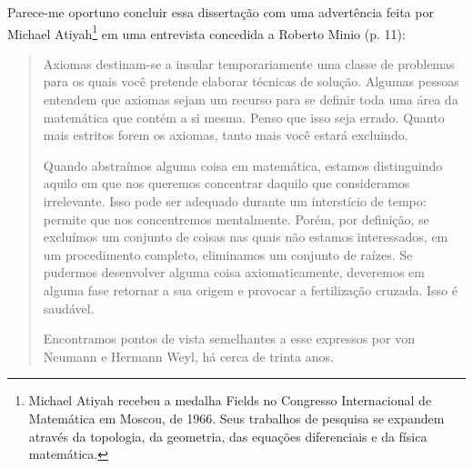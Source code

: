 \documentclass{hipatia}
\begin{document}
Parece-me oportuno concluir essa dissertação com uma advertência feita por Michael Atiyah\footnote{Michael Atiyah recebeu a medalha Fields no Congresso Internacional de Matemática em Moscou, de 1966. Seus trabalhos de pesquisa se expandem através da topologia, da geometria, das equações diferenciais e da física matemática.
} em uma entrevista concedida a Roberto Minio  (p. 11):  
\begin{quote}
Axiomas destinam-se a insular temporariamente uma classe de problemas para os quais você pretende elaborar técnicas de solução. Algumas pessoas entendem que axiomas sejam um recurso para se definir toda uma área da matemática que contém a si mesma. Penso que isso seja errado. Quanto mais estritos forem os axiomas, tanto mais você estará excluindo.

Quando abstraímos alguma coisa em matemática, estamos distinguindo aquilo em que nos queremos concentrar daquilo que consideramos irrelevante. Isso pode ser adequado durante um interstício de tempo: permite que nos concentremos mentalmente. Porém, por definição, se excluímos um conjunto de coisas nas quais não estamos interessados, em um procedimento completo, eliminamos um conjunto de raízes. Se pudermos desenvolver alguma coisa axiomaticamente, deveremos em alguma fase retornar a sua origem e provocar a fertilização cruzada. Isso é saudável.

Encontramos pontos de vista semelhantes a esse expressos por von Neumann e Hermann Weyl, há cerca de trinta anos.
\end{quote}




\vfill    


\nocite{*}





\end{document}
